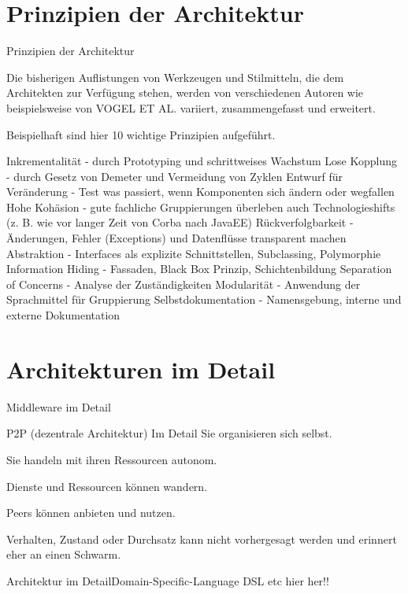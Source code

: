 \documentclass{beamer}
\begin{document}
\section{Prinzipien der Architektur}

\begin{frame}{Prinzipien der Architektur}

Die bisherigen Auflistungen von Werkzeugen und Stilmitteln, die dem Architekten zur Verfügung stehen, werden von verschiedenen Autoren wie beispielsweise von VOGEL ET AL. variiert, zusammengefasst und erweitert.

Beispielhaft sind hier 10 wichtige Prinzipien aufgeführt.

    Inkrementalität
    - durch Prototyping und schrittweises Wachstum
    Lose Kopplung
    - durch Gesetz von Demeter und Vermeidung von Zyklen
    Entwurf für Veränderung
    - Test was passiert, wenn Komponenten sich ändern oder wegfallen
    Hohe Kohäsion
    - gute fachliche Gruppierungen überleben auch Technologieshifts (z. B. wie vor langer Zeit von Corba nach JavaEE)
    Rückverfolgbarkeit
    - Änderungen, Fehler (Exceptions) und Datenflüsse transparent machen
    Abstraktion
    - Interfaces als explizite Schnittstellen, Subclassing, Polymorphie
    Information Hiding
    - Fassaden, Black Box Prinzip, Schichtenbildung
    Separation of Concerns
    - Analyse der Zuständigkeiten
    Modularität
    - Anwendung der Sprachmittel für Gruppierung
    Selbstdokumentation
    - Namensgebung, interne und externe Dokumentation
\end{frame}

\section{Architekturen im Detail}

\begin{frame}
		Middleware im Detail

		P2P (dezentrale Architektur) Im Detail
		    Sie organisieren sich selbst.

    Sie handeln mit ihren Ressourcen autonom.

    Dienste und Ressourcen können wandern.

    Peers können anbieten und nutzen.

    Verhalten, Zustand oder Durchsatz kann nicht vorhergesagt werden und erinnert eher an einen Schwarm.
\end{frame}

\begin{frame}{Architektur im Detail}{Domain-Specific-Language}
	DSL etc hier her!!
\end{frame}
\end{document}

